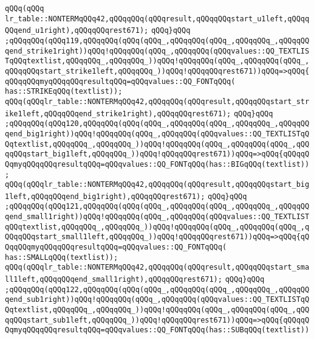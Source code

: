 \verb|qQQq(qQQq|\newline
\verb|lr_table::NONTERMqQQq42,qQQqqQQq(qQQqresult,qQQqqQQqstart_u1left,qQQqqQQqend_u1right),qQQqqQQqrest671);|\newline
\verb|qQQq}qQQq|\newline
\verb|;qQQqqQQq(qQQq119,qQQqqQQq(qQQq(qQQq_,qQQqqQQq(qQQq_,qQQqqQQq_,qQQqqQQqend_strike1right))qQQq!qQQqqQQq(qQQq_,qQQqqQQq(qQQqvalues::QQ_TEXTLISTqQQqtextlist,qQQqqQQq_,qQQqqQQq_))qQQq!qQQqqQQq(qQQq_,qQQqqQQq(qQQq_,qQQqqQQqstart_strike1left,qQQqqQQq_))qQQq!qQQqqQQqrest671))qQQq=>qQQq{qQQqqQQqmyqQQqqQQqresultqQQq=qQQqvalues::QQ_FONTqQQq(|\newline
\verb|has::STRIKEqQQq(textlist));|\newline
\verb|qQQq(qQQqlr_table::NONTERMqQQq42,qQQqqQQq(qQQqresult,qQQqqQQqstart_strike1left,qQQqqQQqend_strike1right),qQQqqQQqrest671);|\newline
\verb|qQQq}qQQq|\newline
\verb|;qQQqqQQq(qQQq120,qQQqqQQq(qQQq(qQQq_,qQQqqQQq(qQQq_,qQQqqQQq_,qQQqqQQqend_big1right))qQQq!qQQqqQQq(qQQq_,qQQqqQQq(qQQqvalues::QQ_TEXTLISTqQQqtextlist,qQQqqQQq_,qQQqqQQq_))qQQq!qQQqqQQq(qQQq_,qQQqqQQq(qQQq_,qQQqqQQqstart_big1left,qQQqqQQq_))qQQq!qQQqqQQqrest671))qQQq=>qQQq{qQQqqQQqmyqQQqqQQqresultqQQq=qQQqvalues::QQ_FONTqQQq(has::BIGqQQq(textlist))|\newline
\verb|;|\newline
\verb|qQQq(qQQqlr_table::NONTERMqQQq42,qQQqqQQq(qQQqresult,qQQqqQQqstart_big1left,qQQqqQQqend_big1right),qQQqqQQqrest671);|\newline
\verb|qQQq}qQQq|\newline
\verb|;qQQqqQQq(qQQq121,qQQqqQQq(qQQq(qQQq_,qQQqqQQq(qQQq_,qQQqqQQq_,qQQqqQQqend_small1right))qQQq!qQQqqQQq(qQQq_,qQQqqQQq(qQQqvalues::QQ_TEXTLISTqQQqtextlist,qQQqqQQq_,qQQqqQQq_))qQQq!qQQqqQQq(qQQq_,qQQqqQQq(qQQq_,qQQqqQQqstart_small1left,qQQqqQQq_))qQQq!qQQqqQQqrest671))qQQq=>qQQq{qQQqqQQqmyqQQqqQQqresultqQQq=qQQqvalues::QQ_FONTqQQq(|\newline
\verb|has::SMALLqQQq(textlist));|\newline
\verb|qQQq(qQQqlr_table::NONTERMqQQq42,qQQqqQQq(qQQqresult,qQQqqQQqstart_small1left,qQQqqQQqend_small1right),qQQqqQQqrest671);|\newline
\verb|qQQq}qQQq|\newline
\verb|;qQQqqQQq(qQQq122,qQQqqQQq(qQQq(qQQq_,qQQqqQQq(qQQq_,qQQqqQQq_,qQQqqQQqend_sub1right))qQQq!qQQqqQQq(qQQq_,qQQqqQQq(qQQqvalues::QQ_TEXTLISTqQQqtextlist,qQQqqQQq_,qQQqqQQq_))qQQq!qQQqqQQq(qQQq_,qQQqqQQq(qQQq_,qQQqqQQqstart_sub1left,qQQqqQQq_))qQQq!qQQqqQQqrest671))qQQq=>qQQq{qQQqqQQqmyqQQqqQQqresultqQQq=qQQqvalues::QQ_FONTqQQq(has::SUBqQQq(textlist))|\newline
